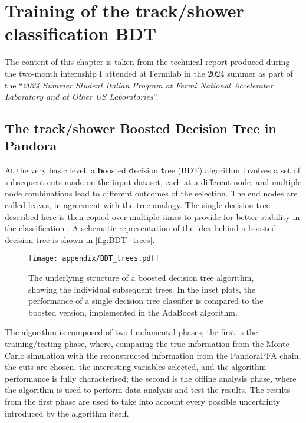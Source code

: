\chapter{Training of the track/shower classification BDT}

The content of this chapter is taken from the technical report produced during the two-month internship I attended at Fermilab in the 2024 summer as part of the ``\emph{2024 Summer Student Italian Program at Fermi National Accelerator Laboratory and at Other US Laboratories}''. 

\section{The track/shower Boosted Decision Tree in Pandora} \label{sec:A_bdt}

At the very basic level, a \textbf{b}oosted \textbf{d}ecision \textbf{t}ree (BDT) algorithm involves a set of subsequent cuts made on the input dataset, each at a different node, and multiple node combinations lead to different outcomes of the selection. The end nodes are called leaves, in agreement with the tree analogy. The single decision tree described here is then copied over multiple times to provide for better stability in the classification \cite{Cornell:2021gut, FREUND1997119}. A schematic representation of the idea behind a boosted decision tree is shown in \autoref{fig:BDT_trees}. 

\begin{figure*}
    \centering
    \texttt{[image: appendix/BDT\_trees.pdf]}
    \caption{The underlying structure of a boosted decision tree algorithm, showing the individual subsequent trees. In the inset plots, the performance of a single decision tree classifier is compared to the boosted version, implemented in the AdaBoost \cite{FREUND1997119} algorithm.}
    \label{fig:BDT_trees}
\end{figure*}

The algorithm is composed of two fundamental phases; the first is the training/testing phase, where, comparing the true information from the Monte Carlo simulation with the reconstructed information from the PandoraPFA chain, the cuts are chosen, the interesting variables selected, and the algorithm performance is fully characterised; the second is the offline analysis phase, where the algorithm is used to perform data analysis and test the results. The results from the first phase are used to take into account every possible uncertainty introduced by the algorithm itself. 

